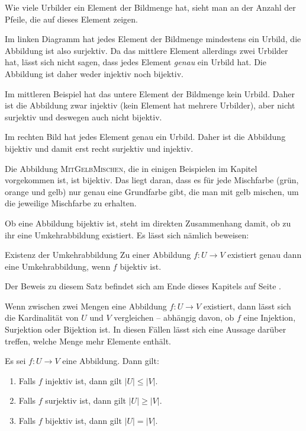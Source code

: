 \documentclass[../../main.tex]{subfiles}
\begin{document}
Wie viele Urbilder ein Element der Bildmenge hat, sieht man an der Anzahl der Pfeile, die auf dieses Element zeigen.

Im linken Diagramm hat jedes Element der Bildmenge mindestens ein Urbild, die Abbildung ist also surjektiv. Da das mittlere Element allerdings zwei Urbilder hat, lässt sich nicht sagen, dass jedes Element \emph{genau} ein Urbild hat. Die Abbildung ist daher weder injektiv noch bijektiv.

Im mittleren Beispiel hat das untere Element der Bildmenge kein Urbild. Daher ist die Abbildung zwar injektiv (kein Element hat mehrere Urbilder), aber nicht surjektiv und deswegen auch nicht bijektiv.

Im rechten Bild hat jedes Element genau ein Urbild. Daher ist die Abbildung bijektiv und damit erst recht surjektiv und injektiv.

\begin{example}{}
    Die Abbildung \textsc{MitGelbMischen}, die in einigen Beispielen im Kapitel vorgekommen ist, ist bijektiv. Das liegt daran, dass es für jede Mischfarbe (grün, orange und gelb) nur genau eine Grundfarbe gibt, die man mit gelb mischen, um die jeweilige Mischfarbe zu erhalten.
\end{example}

Ob eine Abbildung bijektiv ist, steht im direkten Zusammenhang damit, ob zu ihr eine Umkehrabbildung existiert. Es lässt sich nämlich beweisen:

\begin{theorem}{Existenz der Umkehrabbildung}
    Zu einer Abbildung $f\colon U\rightarrow V$ existiert genau dann eine Umkehrabbildung, wenn $f$ bijektiv ist.
\end{theorem}

Der Beweis zu diesem Satz befindet sich am Ende dieses Kapitels auf Seite \pageref{proof:existenceOfInverseMap}.

Wenn zwischen zwei Mengen eine Abbildung $f\colon U\rightarrow V$ existiert, dann lässt sich die Kardinalität von $U$ und $V$ vergleichen -- abhängig davon, ob $f$ eine Injektion, Surjektion oder Bijektion ist. In diesen Fällen lässt sich eine Aussage darüber treffen, welche Menge mehr Elemente enthält.

\begin{theorem}{}
    Es sei $f\colon U\rightarrow V$ eine Abbildung. Dann gilt:
    \begin{enumerate}
        \item Falls $f$ injektiv ist, dann gilt $|U|\leq |V|$.
        \item Falls $f$ surjektiv ist, dann gilt $|U|\geq |V|$.
        \item Falls $f$ bijektiv ist, dann gilt $|U|=|V|$.
    \end{enumerate}
\end{theorem}
\end{document}
